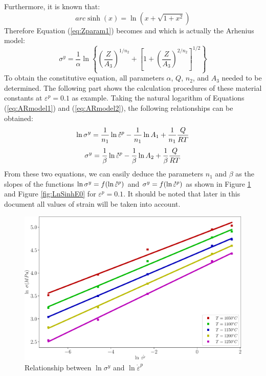 \documentclass[twoside,english,1p,final,sort&compress]{elsarticle}
\theoremstyle{plain}
\newcommand{\mdot}[1]{\accentset{\mbox{\bfseries .}}{#1}}
\begin{document}
Furthermore, it is known that:
\begin{equation}
arc\sinh(x) = \ln\left(x + \sqrt{1+x^2}\right)
\end{equation}
Therefore Equation (\ref{eq:Zparam1}) becomes and which is actually the Arhenius model: 
\begin{equation}
\sigma^y = \frac{1}{\alpha}\ln\left\{\left(\frac{Z}{A_3}\right)^{1/n_2} + \left[1 + \left(\frac{Z}{A_3}\right)^{2/n_2}\right]^{1/2}\right\}
\end{equation}
To obtain the constitutive equation, all parameters $\alpha$, $Q$, $n_2$, and $A_3$ needed to be determined. The following part shows the calculation procedures of these material constants at $\varepsilon^p = 0.1$ as example. Taking the natural logarithm of Equations (\ref{eq:ARmodel1}) and (\ref{eq:ARmodel2}), the following relationships can be obtained: 
\begin{equation}
\ln \sigma^y = \frac{1}{n_1}\ln \mdot{\varepsilon}^p -\frac{1}{n_1}\ln A_1 +  \frac{1}{n_1}\frac{Q}{RT}
\end{equation}
\begin{equation}
\sigma^y = \frac{1}{\beta}\ln \mdot{\varepsilon}^p - \frac{1}{\beta}\ln A_2 + \frac{1}{\beta}\frac{Q}{RT} 
\end{equation}
From these two equations, we can easily deduce the parameters $n_1$ and $\beta$ as the slopes of the functions $\ln\sigma^y = f(\ln\mdot{\varepsilon}^p)$  and $\sigma^y = f(\ln\mdot{\varepsilon}^p)$ as shown in Figure \ref{fig:LnAlp} and Figure \ref{fig:LnSinhE0} for $\varepsilon^p = 0.1$. It should be noted that later in this document all values of strain will be taken into account.
\begin{figure}[!ht]
\centering
\includegraphics[width=0.9\columnwidth]{newFigures/LnAlp}
\caption{Relationship between $\ln \sigma^y$ and $\ln \dot{\varepsilon}^p$}
\label{fig:LnAlp}
\end{figure}
\end{document}

